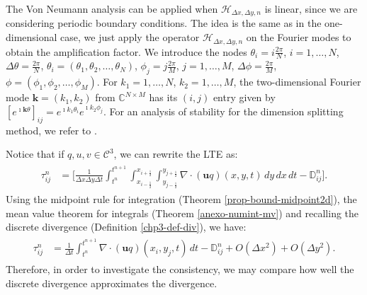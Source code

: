 The Von Neumann analysis can be applied when $\mathcal{H}_{\Delta x ,\Delta y,n}$ is linear, since we are considering periodic boundary conditions.
The idea is the same as in the one-dimensional case, we just apply the operator $\mathcal{H}_{\Delta x ,\Delta y,n}$ on the Fourier modes to obtain
the amplification factor.
We introduce the nodes $\theta_i = i\frac{2\pi}{N}$, $i=1, \ldots, N$, $\Delta \theta = \frac{2\pi}{N}$,
$\theta_i = (\theta_1, \theta_2, \ldots, \theta_N)$, $\phi_j = j\frac{2\pi}{M}$, $j=1, \ldots, M$, $\Delta \phi = \frac{2\pi}{M}$,
$\phi = (\phi_1, \phi_2, \ldots, \phi_M)$.
For $k_1=1, \ldots, N$, $k_2=1, \ldots, M$, the two-dimensional Fourier mode $\boldsymbol{k} = (k_1,k_2)$ from $\mathbb{C}^{N\times M}$ 
has its $(i,j)$ entry given by $[e^{\imath \boldsymbol{k} \theta}]_{ij} = e^{\imath k_1 \theta_i}e^{\imath k_2 \phi_j}$. 
For an analysis of stability for the dimension splitting method, we refer to \citet{lin:1996,lauritzen:2007}.

Notice that if $q,u, v \in \mathcal{C}^3$, we can rewrite the LTE as:
\begin{align*}
	\begin{split}
		\tau_{ij}^n &= 
		\bigg[ \frac{1}{\Delta x \Delta y \Delta t}  \int_{t^{n}}^{t^{n+1}}\int_{x_{i-\frac{1}{2}}}^{x_{i+\frac{1}{2}}} 
		\int_{y_{j-\frac{1}{2}}}^{y_{j+\frac{1}{2}}} {\nabla \cdot (\boldsymbol{u}q)}(x, y, t) \,dy \,dx \,dt 
        -\mathbb{D}_{ij}^n
		\bigg].
	\end{split}
\end{align*}
Using the midpoint rule for integration (Theorem \ref{prop-bound-midpoint2d}), the mean value theorem for integrals
(Theorem \ref{anexo-numint-mv}) and recalling the discrete divergence (Definition \ref{chp3-def-div}), we have:
\begin{align}
	\begin{split}
		\label{consistency-2d-eq}
		\tau_{ij}^n 
		&= \frac{1}{\Delta t}  \int_{t^{n}}^{t^{n+1}}
		{\nabla \cdot (\boldsymbol{u}q)}(x_i, y_j, t)  \,dt - 
		\mathbb{D}^n_{ij} + O(\Delta x^2) + O(\Delta y^2).
	\end{split}
\end{align}
Therefore, in order to investigate the consistency, we may compare how well the discrete divergence approximates the divergence.


